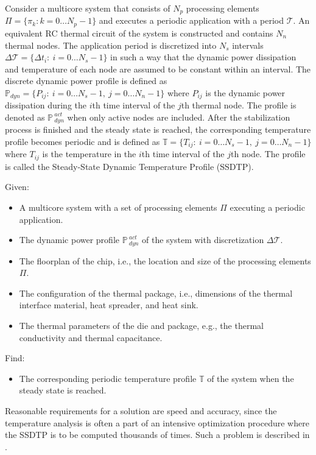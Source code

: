 Consider a multicore system that consists of $N_p$ processing elements $\Pi = \{ \pi_k: k = 0 \dots N_p - 1 \}$ and executes a periodic application with a period $\mathcal{T}$. An equivalent RC thermal circuit of the system is constructed and contains $N_n$ thermal nodes. The application period is discretized into $N_s$ intervals \mbox{$\Delta \mathcal{T} = \{ \Delta t_i: \: i = 0 \dots N_s - 1 \}$} in such a way that the dynamic power dissipation and temperature of each node are assumed to be constant within an interval. The discrete dynamic power profile is defined as \mbox{$\mathbb{P}_{dyn} = \{ P_{ij}: \: i = 0 \dots N_s - 1, \: j = 0 \dots N_n - 1 \}$} where $P_{ij}$ is the dynamic power dissipation during the $i$th time interval of the $j$th thermal node. The profile is denoted as $\mathbb{P}_{\: dyn}^{\:act}$ when only active nodes are included. After the stabilization process is finished and the steady state is reached, the corresponding temperature profile becomes periodic and is defined as \mbox{$\mathbb{T} = \{ T_{ij}: \: i = 0 \dots N_s - 1, \: j = 0 \dots N_n - 1 \}$} where $T_{ij}$ is the temperature in the $i$th time interval of the $j$th node. The profile is called the Steady-State Dynamic Temperature Profile (SSDTP).

Given:
\begin{itemize}
  \item A multicore system with a set of processing elements $\Pi$ executing a periodic application.
  \item The dynamic power profile $\mathbb{P}_{\:dyn}^{\:act}$ of the system with discretization $\Delta \mathcal{T}$.
  \item The floorplan of the chip, i.e., the location and size of the processing elements $\Pi$.
  \item The configuration of the thermal package, i.e., dimensions of the thermal interface material, heat spreader, and heat sink.
  \item The thermal parameters of the die and package, e.g., the thermal conductivity and thermal capacitance.
\end{itemize}

Find:
\begin{itemize}
  \item The corresponding periodic temperature profile $\mathbb{T}$ of the system when the steady state is reached.
\end{itemize}

Reasonable requirements for a solution are speed and accuracy, since the temperature analysis is often a part of an intensive optimization procedure where the SSDTP is to be computed thousands of times. Such a problem is described in .
